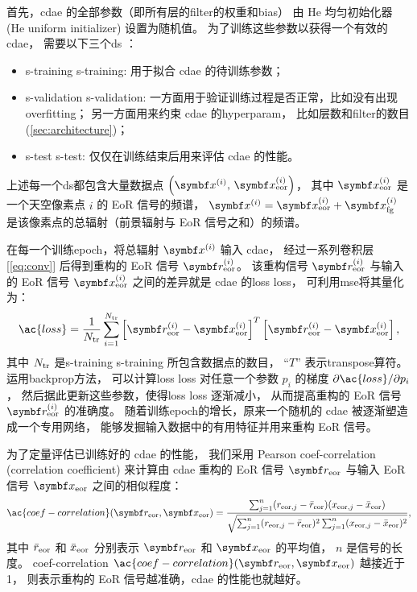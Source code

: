 首先，\ac{cdae} 的全部参数（即所有层的\ac{filter}的权重和\ac{bias}）
由 He 均匀初始化器 (He uniform initializer)\cite{he2015} 设置为随机值。
为了训练这些参数以获得一个有效的 \ac{cdae}，
需要以下三个\ac{ds} \cite{ripley1996}：
\begin{itemize}
  \item \acl{s-training} \ac{s-training}:
    用于拟合 \ac{cdae} 的待训练参数；
  \item \acl{s-validation} \ac{s-validation}:
    一方面用于验证训练过程是否正常，比如没有出现\ac{overfitting}；
    另一方面用来约束 \ac{cdae} 的\ac{hyperparam}，
    比如层数和\ac{filter}的数目 (\autoref{sec:architecture})；
  \item \acl{s-test} \ac{s-test}:
    仅仅在训练结束后用来评估 \ac{cdae} 的性能。
\end{itemize}
上述每一个\ac{ds}都包含大量数据点
$\left( \B{x}^{(i)}, \,\B{x}^{(i)}_{\R{eor}} \right)$，
其中 $\B{x}^{(i)}_{\R{eor}}$ 是一个天空像素点 $i$ 的 EoR 信号的频谱，
$\B{x}^{(i)} = \B{x}^{(i)}_{\R{eor}} + \B{x}^{(i)}_{\R{fg}}$
是该像素点的总辐射（前景辐射与 EoR 信号之和）的频谱。

在每一个训练\ac{epoch}，将总辐射 $\B{x}^{(i)}$ 输入 \ac{cdae}，
经过一系列卷积层 [\autoref{eq:conv}]
后得到重构的 EoR 信号 $\B{r}^{(i)}_{\R{eor}}$。
该重构信号 $\B{r}^{(i)}_{\R{eor}}$ 与输入的 EoR 信号 $\B{x}^{(i)}_{\R{eor}}$
之间的差异就是 \ac{cdae} 的\acl{loss} \ac{loss}，
可利用\ac{mse}将其量化为：
\begin{equation}
  \label{eq:loss}
  \ac{loss} = \frac{1}{N_{\R{tr}}} \sum_{i=1}^{N_{\R{tr}}}
    \left[ \B{r}_{\R{eor}}^{(i)} - \B{x}_{\R{eor}}^{(i)} \right]^T
    \left[ \B{r}_{\R{eor}}^{(i)} - \B{x}_{\R{eor}}^{(i)} \right] ,
\end{equation}
其中 $N_{\mathrm{tr}}$ 是\acl{s-training} \ac{s-training} 所包含数据点的数目，
\enquote{$T$} 表示\ac{transpose}算符。
运用\ac{backprop}方法\cite{rumelhart1986,leCun1998bp}，
可以计算\acl{loss} \ac{loss} 对任意一个参数 $p_i$ 的梯度
$\partial \ac{loss} / \partial p_i$，
然后据此更新这些参数，使得\acl{loss} \ac{loss} 逐渐减小，
从而提高重构的 EoR 信号 $\B{r}^{(i)}_{\R{eor}}$ 的准确度。
随着训练\ac{epoch}的增长，原来一个随机的 \ac{cdae} 被逐渐塑造成一个专用网络，
能够发掘输入数据中的有用特征并用来重构 EoR 信号。

为了定量评估已训练好的 \ac{cdae} 的性能，
我们采用 Pearson \acl{coef-correlation} (correlation coefficient)
\cite{harker2009,chapman2013}
来计算由 \ac{cdae} 重构的 EoR 信号 $\B{r}_{\R{eor}}$ 与输入 EoR 信号
$\B{x}_{\R{eor}}$ 之间的相似程度：
\begin{equation}
  \label{eq:corrcoef}
  \ac{coef-correlation}(\B{r}_{\R{eor}}, \B{x}_{\R{eor}})
      = \frac{\sum_{j=1}^{n}(r_{\R{eor},j} - \bar{r}_{\R{eor}})
            (x_{\R{eor},j} - \bar{x}_{\R{eor}})}{
          \sqrt{\sum_{j=1}^{n}(r_{\R{eor},j} - \bar{r}_{\R{eor}})^2
            \sum_{j=1}^{n}(x_{\R{eor},j} - \bar{x}_{\R{eor}})^2}
        } ,
\end{equation}
其中
$\bar{r}_{\mathrm{eor}}$ 和 $\bar{x}_{\mathrm{eor}}$ 分别表示
$\B{r}_{\R{eor}}$ 和 $\B{x}_{\R{eor}}$ 的平均值，
$n$ 是信号的长度。
\acl{coef-correlation}
$\ac{coef-correlation}(\B{r}_{\R{eor}}, \B{x}_{\R{eor}})$ 越接近于 1，
则表示重构的 EoR 信号越准确，\ac{cdae} 的性能也就越好。


